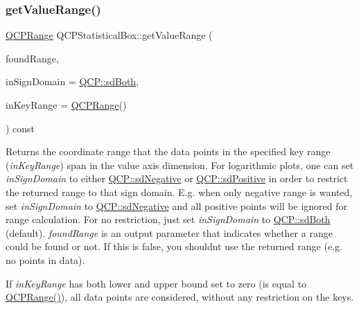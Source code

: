 \subsubsection{\texorpdfstring{get\+Value\+Range()}{getValueRange()}}
{\footnotesize\ttfamily \hyperlink{class_q_c_p_range}{Q\+C\+P\+Range} Q\+C\+P\+Statistical\+Box\+::get\+Value\+Range (\begin{DoxyParamCaption}\item[{bool \&}]{found\+Range,  }\item[{\hyperlink{namespace_q_c_p_afd50e7cf431af385614987d8553ff8a9}{Q\+C\+P\+::\+Sign\+Domain}}]{in\+Sign\+Domain = {\ttfamily \hyperlink{namespace_q_c_p_afd50e7cf431af385614987d8553ff8a9aa38352ef02d51ddfa4399d9551566e24}{Q\+C\+P\+::sd\+Both}},  }\item[{const \hyperlink{class_q_c_p_range}{Q\+C\+P\+Range} \&}]{in\+Key\+Range = {\ttfamily \hyperlink{class_q_c_p_range}{Q\+C\+P\+Range}()} }\end{DoxyParamCaption}) const\hspace{0.3cm}{\ttfamily [virtual]}}

Returns the coordinate range that the data points in the specified key range ({\itshape in\+Key\+Range}) span in the value axis dimension. For logarithmic plots, one can set {\itshape in\+Sign\+Domain} to either \hyperlink{namespace_q_c_p_afd50e7cf431af385614987d8553ff8a9a2d18af0bc58f6528d1e82ce699fe4829}{Q\+C\+P\+::sd\+Negative} or \hyperlink{namespace_q_c_p_afd50e7cf431af385614987d8553ff8a9a584784b75fb816abcc627cf743bb699f}{Q\+C\+P\+::sd\+Positive} in order to restrict the returned range to that sign domain. E.\+g. when only negative range is wanted, set {\itshape in\+Sign\+Domain} to \hyperlink{namespace_q_c_p_afd50e7cf431af385614987d8553ff8a9a2d18af0bc58f6528d1e82ce699fe4829}{Q\+C\+P\+::sd\+Negative} and all positive points will be ignored for range calculation. For no restriction, just set {\itshape in\+Sign\+Domain} to \hyperlink{namespace_q_c_p_afd50e7cf431af385614987d8553ff8a9aa38352ef02d51ddfa4399d9551566e24}{Q\+C\+P\+::sd\+Both} (default). {\itshape found\+Range} is an output parameter that indicates whether a range could be found or not. If this is false, you shouldn\textquotesingle{}t use the returned range (e.\+g. no points in data).

If {\itshape in\+Key\+Range} has both lower and upper bound set to zero (is equal to {\ttfamily \hyperlink{class_q_c_p_range}{Q\+C\+P\+Range()}}), all data points are considered, without any restriction on the keys.

